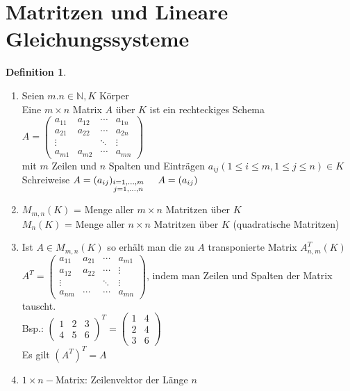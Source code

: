 \documentclass[a4paper,11pt]{article}
\newtheorem{definition}{Definition}[section]
\begin{document}
\section{Matritzen und Lineare Gleichungssysteme}
\begin{definition}
\end{definition}
\begin{enumerate}[label=\alph*)]
\item Seien $m.n\in\mathbb{N},K$ Körper \\
Eine $m\times n$ Matrix $A$ über $K$ ist ein rechteckiges Schema \\
$A=\begin{pmatrix}a_{11}&a_{12}&\cdots&a_{1n}\\a_{21}&a_{22}&\cdots&a_{2n}\\\vdots&&\ddots&\vdots\\a_{m1}&a_{m2}&\cdots&a_{mn}\end{pmatrix}$\\
mit $m$ Zeilen und $n$ Spalten und Einträgen $a_{ij}(1\leq i\leq m, 1\leq j\leq n)\in K$ \\
Schreiweise $A=(a_{ij})_{\substack{i=1,...,m\\j=1,...,n}}\hspace{5mm}A=(a_{ij})$
\item $M_{m,n}(K)$ = Menge aller $m\times n$ Matritzen über $K$ \\
$M_n(K)$ = Menge aller $n\times n$ Matritzen über $K$ (quadratische Matritzen)
\item Ist $A\in M_{m,n}(K)$ so erhält man die zu $A$ transponierte Matrix $A^T_{n,m}(K)$ \\
$A^T=\begin{pmatrix}a_{11}&a_{21}&\cdots&a_{m1}\\a_{12}&a_{22}&\cdots&\vdots\\\vdots&&\ddots&\vdots\\a_{nm}&\cdots&\cdots&a_{mn}\end{pmatrix}$, indem man Zeilen und Spalten der Matrix tauscht. \\
Bsp.: $\begin{pmatrix}1&2&3\\4&5&6\end{pmatrix}^T=\begin{pmatrix}1&4\\2&4\\3&6\end{pmatrix}$ \\
Es gilt $(A^T)^T=A$
\item $1\times n-$Matrix: Zeilenvektor der Länge $n$ \\

\end{enumerate}
\end{document}

